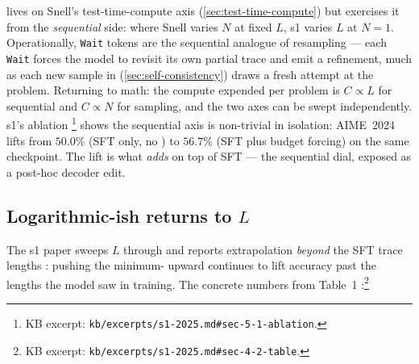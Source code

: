 \begin{intuition}
 lives on Snell's test-time-compute axis
(\cref{sec:test-time-compute}) but exercises it from the
\emph{sequential} side: where Snell varies $N$ at fixed $L$, s1 varies
$L$ at $N = 1$. Operationally, \texttt{Wait} tokens are the
sequential analogue of resampling --- each \texttt{Wait} forces the
model to revisit its own partial trace and emit a refinement, much as
each new sample in  (\cref{sec:self-consistency})
draws a fresh attempt at the problem. Returning to math: the compute
expended per problem is $C \propto L$ for sequential and $C \propto N$
for sampling, and the two axes can be swept independently. s1's
ablation \citep[\S 5.1]{s1-2025}\footnote{KB excerpt:
\nolinkurl{kb/excerpts/s1-2025.md#sec-5-1-ablation}.} shows the
sequential axis is non-trivial in isolation: AIME~2024 lifts from
$50.0\%$ (SFT only, no ) to $56.7\%$ (SFT plus budget
forcing) on the same checkpoint. The lift is what 
\emph{adds} on top of SFT --- the sequential  dial, exposed as a
post-hoc decoder edit.
\end{intuition}

\subsection{Logarithmic-ish returns to $L$}
\label{sec:log-returns}

The s1 paper sweeps $L$ through  and reports
extrapolation \emph{beyond} the SFT trace lengths
\citep[abstract, \S 4.2]{s1-2025}: pushing the minimum-
upward continues to lift accuracy past the lengths the model saw in
training. The concrete numbers from
Table~1 \citep[\S 4.2]{s1-2025}:\footnote{KB excerpt:
\nolinkurl{kb/excerpts/s1-2025.md#sec-4-2-table}.}

